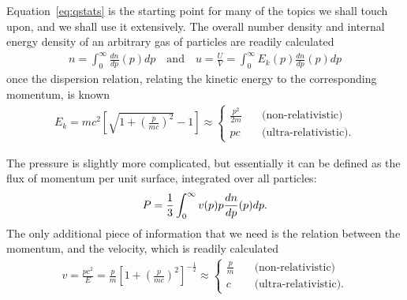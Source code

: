 Equation~\eqref{eq:qstats} is the starting point for many of the topics we shall
touch upon, and we shall use it extensively. The overall number density and internal
energy density of an arbitrary gas of particles are readily calculated
\begin{align*}
  n = \int_0^\infty \frac{dn}{dp}(p) dp \quad \text{and} \quad
  u = \frac{U}{V} = \int_0^\infty E_k(p) \frac{dn}{dp}(p) dp
\end{align*}
once the dispersion relation, relating the kinetic energy to the corresponding
momentum, is known
\begin{align*}
  E_k = mc^2 \left[ \sqrt{1 + \left(\frac{p}{mc} \right)^2} - 1\right] \approx
  \begin{cases}
    \frac{p^2}{2m} & \quad \text{(non-relativistic)} \\
    pc & \quad \text{(ultra-relativistic)}.
  \end{cases}
\end{align*}

The pressure is slightly more complicated, but essentially it can be defined as
the flux of momentum per unit surface, integrated over all particles:
\begin{align*}
  P = \frac{1}{3} \int_0^\infty v(p) p \frac{dn}{dp}(p) dp.
\end{align*}
The only additional piece of information that we need is the relation between the
momentum, and the velocity, which is readily calculated
\begin{align*}
  v = \frac{pc^2}{E} =
  \frac{p}{m} \left[1 + \left(\frac{p}{mc} \right)^2 \right]^{-\frac{1}{2}} \approx
  \begin{cases}
    \frac{p}{m} & \quad \text{(non-relativistic)} \\
    c & \quad \text{(ultra-relativistic)}.
  \end{cases}
\end{align*}

